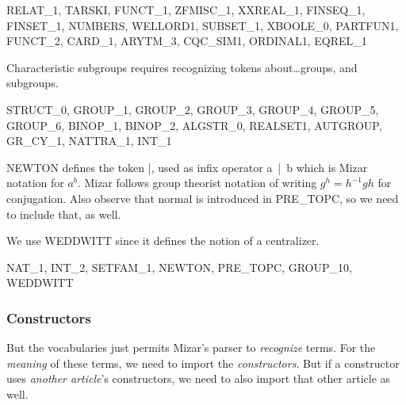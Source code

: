\nwenddocs{}\endmoddef\nwstartdeflinemarkup{}\nwenddeflinemarkup
RELAT_1, TARSKI, FUNCT_1, ZFMISC_1, XXREAL_1, FINSEQ_1,
FINSET_1, NUMBERS, WELLORD1, SUBSET_1, XBOOLE_0, PARTFUN1,
FUNCT_2, CARD_1, ARYTM_3, CQC_SIM1, ORDINAL1, EQREL_1
\nwendcode{}\nwdocspar

Characteristic subgroups requires recognizing tokens about\dots groups,
and subgroups.

\nwenddocs{}\endmoddef\nwstartdeflinemarkup{}\nwenddeflinemarkup
STRUCT_0, GROUP_1, GROUP_2, GROUP_3, GROUP_4, GROUP_5,
GROUP_6, BINOP_1, BINOP_2, ALGSTR_0, REALSET1, AUTGROUP,
GR_CY_1, NATTRA_1, INT_1
\nwendcode{}\nwdocspar

{\Tt{}NEWTON\nwendquote} defines the token {\Tt{}|{}\nwendquote}, used as infix operator {\Tt{}a\ |{}\ b\nwendquote}
which is Mizar notation for $a^{b}$. Mizar follows group theorist
notation of writing $g^{h} = h^{-1}gh$ for conjugation. Also observe
that {\Tt{}normal\nwendquote} is introduced in {\Tt{}PRE{\_}TOPC\nwendquote}, so we need to include
that, as well.

We use {\Tt{}WEDDWITT\nwendquote} since it defines the notion of a centralizer.

\nwenddocs{}\endmoddef\nwstartdeflinemarkup{}\nwenddeflinemarkup
NAT_1, INT_2, SETFAM_1, NEWTON, PRE_TOPC, GROUP_10, WEDDWITT
\nwendcode{}\nwdocspar

\subsubsection{Constructors}
But the vocabularies just permits Mizar's parser to \emph{recognize}
terms. For the \emph{meaning} of these terms, we need to import the
\emph{constructors}. But if a constructor uses \emph{another article}'s
constructors, we need to also import that other article as well.

